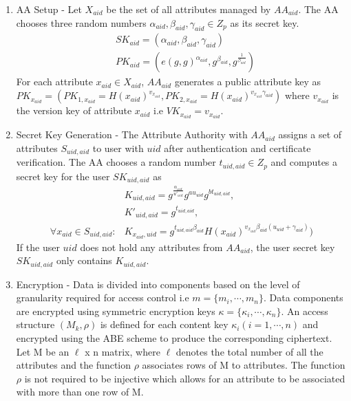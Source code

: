 \begin{enumerate}
\begin{enumerate}
	\end{enumerate}
	
	\item AA Setup - Let $ X_{aid} $ be the set of all attributes managed by $ AA_{aid} $. The AA chooses three random numbers $ \alpha_{aid}, \beta_{aid}, \gamma_{aid} \in Z_{p} $ as its secret key.
	\begin{align*}
	&SK_{aid} = (\alpha_{aid}, \beta_{aid}, \gamma_{aid}) \\
	&PK_{aid} = (e(g, g)^{\alpha_{aid}}, g^{\beta_{aid}}, g^{\frac{1}{\beta_{aid}}})
	\end{align*}
	For each attribute $ x_{aid} \in X_{aid} $, $ AA_{aid} $ generates a public attribute key as $ PK_{x_{aid}} = (PK_{1, x_{aid}} = H(x_{aid})^{v_{x_{aid}}}, PK_{2, x_{aid}} = H(x_{aid})^{v_{x_{aid}}\gamma_{aid}}) $ where $ v_{x_{aid}} $ is the version key of attribute $ x_{aid} $ i.e $ VK_{x_{aid}} = v_{x_{aid}} $.
	
	\item Secret Key Generation - The Attribute Authority with $ AA_{aid} $ assigns a set of attributes $ S_{uid,aid} $ to user with $ uid $ after authentication and certificate verification. The AA chooses a random number $ t_{uid,aid} \in Z_{p} $ and computes a secret key for the user $SK_{uid,aid}$ as
	\begin{align*}
	&K_{uid,aid} = g^{\frac{\alpha_{aid}}{u'_{uid}}}g^{au_{uid}}g^{bt_{uid,aid}},\\ &K'_{uid,aid} = g^{t_{uid,aid}}, \\
	\forall x_{aid} \in S_{uid,aid} \colon &K_{x_{aid},uid} = g^{t_{uid,aid}\beta_{aid}}H(x_{aid})^{v_{x_{aid}}\beta_{aid}(u_{uid} + \gamma_{aid})})
	\end{align*}
	If the user $ uid $ does not hold any attributes from $ AA_{aid} $, the user secret key $ SK_{uid,aid} $ only contains $ K_{uid,aid} $.
	
	\item Encryption - Data is divided into components based on the level of granularity required for access control i.e $ m = \{m_{i}, \cdots, m_{n}\} $. Data components are encrypted using symmetric encryption keys $ \kappa = \{\kappa_{i}, \cdots, \kappa_{n}\} $. An access structure $ (M_{k}, \rho) $ is defined for each content key $ \kappa_{i} (i = 1, \cdots, n) $ and encrypted using the ABE scheme to produce the corresponding ciphertext. Let M be an $\ell$ x n matrix, where $\ell$ denotes the total number of all the attributes and the function $ \rho $ associates rows of M to attributes. The function $\rho$ is not required to be injective which allows for an attribute to be associated with more than one row of M.
	

\end{enumerate}
